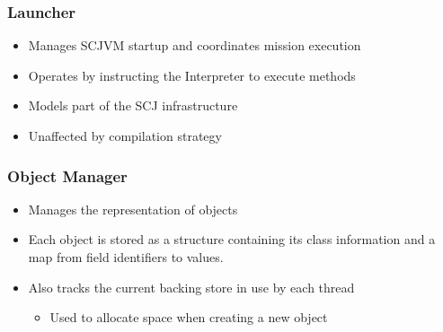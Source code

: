 \documentclass{beamer}
\begin{document}
\begin{frame}
  \frametitle{Launcher}
  \begin{itemize}
  \item Manages SCJVM startup and coordinates mission execution
  \item Operates by instructing the Interpreter to execute methods
  \item Models part of the SCJ infrastructure
  \item Unaffected by compilation strategy
  \end{itemize}
\end{frame}

\begin{frame}
  \frametitle{Object Manager}
  \begin{itemize}
  \item Manages the representation of objects
  \item Each object is stored as a structure containing its class
    information and a map from field identifiers to values.
  \item Also tracks the current backing store in use by each thread
    \begin{itemize}
    \item Used to allocate space when creating a new object
    \end{itemize}
  \end{itemize}
\end{frame}
\end{document}
